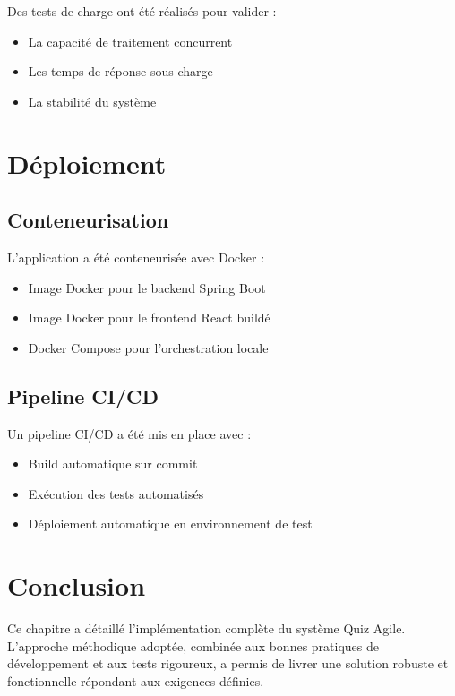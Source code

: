 \documentclass[12pt,a4paper]{report}
\begin{document}
Des tests de charge ont été réalisés pour valider :

\begin{itemize}
    \item La capacité de traitement concurrent
    \item Les temps de réponse sous charge
    \item La stabilité du système
\end{itemize}

\section{Déploiement}

\subsection{Conteneurisation}

L'application a été conteneurisée avec Docker :

\begin{itemize}
    \item Image Docker pour le backend Spring Boot
    \item Image Docker pour le frontend React buildé
    \item Docker Compose pour l'orchestration locale
\end{itemize}

\subsection{Pipeline CI/CD}

Un pipeline CI/CD a été mis en place avec :

\begin{itemize}
    \item Build automatique sur commit
    \item Exécution des tests automatisés
    \item Déploiement automatique en environnement de test
\end{itemize}

\section{Conclusion}

Ce chapitre a détaillé l'implémentation complète du système Quiz Agile. L'approche méthodique adoptée, combinée aux bonnes pratiques de développement et aux tests rigoureux, a permis de livrer une solution robuste et fonctionnelle répondant aux exigences définies.
\end{document}
